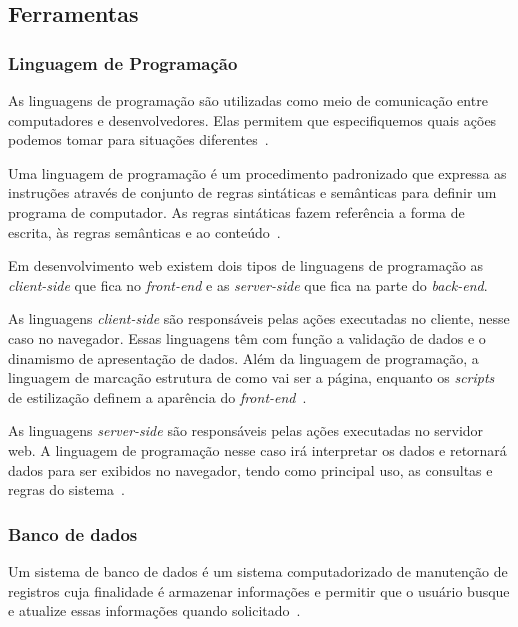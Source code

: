 \subsection{Ferramentas}


\subsubsection{Linguagem de Programação}

As linguagens de programação são utilizadas como meio de comunicação entre computadores e desenvolvedores. 
Elas permitem que especifiquemos quais ações podemos tomar para situações diferentes~\cite{costa2017colossus}.

Uma linguagem de programação é um procedimento padronizado que expressa as instruções através de conjunto de regras sintáticas e semânticas para definir um programa de computador.
As regras sintáticas fazem referência a forma de escrita, às regras semânticas e ao conteúdo~\cite{gotardo2015linguagem}.

Em desenvolvimento web existem dois tipos de linguagens de programação as \textit{client-side} que fica no \textit{front-end} e as \textit{server-side} que fica na parte do \textit{back-end}.

As linguagens \textit{client-side} são responsáveis pelas ações executadas no cliente, nesse caso no navegador.
Essas linguagens têm com função a validação de dados e o dinamismo de apresentação de dados.
Além da linguagem de programação, a linguagem de marcação estrutura de como vai ser a página, enquanto os \textit{scripts} de estilização definem a aparência do \textit{front-end}~\cite{silveira2015desenvolvimento}.

As linguagens \textit{server-side} são responsáveis pelas ações executadas no servidor web.
A linguagem de programação nesse caso irá interpretar os dados e retornará dados para ser exibidos no navegador, tendo como principal uso, as consultas e regras do sistema~\cite{campos2007realidade}.

\subsubsection{Banco de dados}

Um sistema de banco de dados é um sistema computadorizado de manutenção de registros cuja finalidade é armazenar informações e permitir que o usuário busque e atualize essas informações quando solicitado~\cite{date2004introduccao}.

